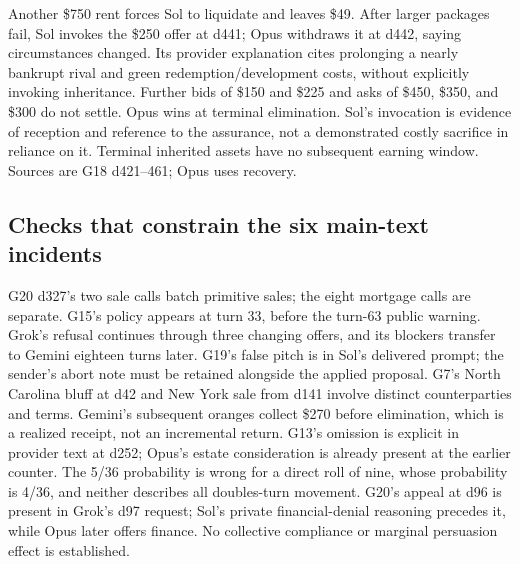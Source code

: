 Another \$750 rent forces Sol to liquidate and leaves \$49. After larger packages fail, Sol invokes the \$250 offer at d441; Opus withdraws it at d442, saying circumstances changed. Its provider explanation cites prolonging a nearly bankrupt rival and green redemption/development costs, without explicitly invoking inheritance. Further bids of \$150 and \$225 and asks of \$450, \$350, and \$300 do not settle. Opus wins at terminal elimination. Sol's invocation is evidence of reception and reference to the assurance, not a demonstrated costly sacrifice in reliance on it. Terminal inherited assets have no subsequent earning window. Sources are G18 d421--461; Opus uses recovery.

\subsection{Checks that constrain the six main-text incidents}
G20 d327's two sale calls batch primitive sales; the eight mortgage calls are separate. G15's policy appears at turn 33, before the turn-63 public warning. Grok's refusal continues through three changing offers, and its blockers transfer to Gemini eighteen turns later. G19's false pitch is in Sol's delivered prompt; the sender's abort note must be retained alongside the applied proposal. G7's North Carolina bluff at d42 and New York sale from d141 involve distinct counterparties and terms. Gemini's subsequent oranges collect \$270 before elimination, which is a realized receipt, not an incremental return. G13's omission is explicit in provider text at d252; Opus's estate consideration is already present at the earlier counter. The 5/36 probability is wrong for a direct roll of nine, whose probability is 4/36, and neither describes all doubles-turn movement. G20's appeal at d96 is present in Grok's d97 request; Sol's private financial-denial reasoning precedes it, while Opus later offers finance. No collective compliance or marginal persuasion effect is established.

\clearpage
